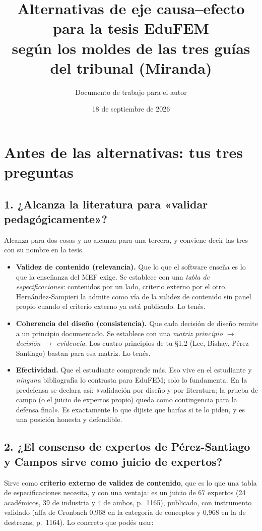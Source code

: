 \documentclass[11pt,a4paper]{article}
\title{Alternativas de eje causa--efecto para la tesis EduFEM\\
\large según los moldes de las tres guías del tribunal (Miranda)}
\author{Documento de trabajo para el autor}
\date{18 de septiembre de 2026}
\begin{document}
\maketitle

\section*{Antes de las alternativas: tus tres preguntas}

\subsection*{1. ¿Alcanza la literatura para «validar pedagógicamente»?}

Alcanza para dos cosas y no alcanza para una tercera, y conviene decir las tres con su nombre en la tesis.

\begin{itemize}
\item \textbf{Validez de contenido (relevancia).} Que lo que el software enseña es lo que la enseñanza del MEF exige. Se establece con una \emph{tabla de especificaciones}: contenidos por un lado, criterio externo por el otro. Hernández-Sampieri la admite como vía de la validez de contenido sin panel propio cuando el criterio externo ya está publicado. Lo tenés.
\item \textbf{Coherencia del diseño (consistencia).} Que cada decisión de diseño remite a un principio documentado. Se establece con una \emph{matriz principio $\to$ decisión $\to$ evidencia}. Los cuatro principios de tu §1.2 (Lee, Bishay, Pérez-Santiago) bastan para esa matriz. Lo tenés.
\item \textbf{Efectividad.} Que el estudiante comprende más. Eso vive en el estudiante y \emph{ninguna} bibliografía lo contrasta para EduFEM; solo lo fundamenta. En la predefensa se declara así: «validación por diseño y por literatura; la prueba de campo (o el juicio de expertos propio) queda como contingencia para la defensa final». Es exactamente lo que dijiste que harías si te lo piden, y es una posición honesta y defendible.
\end{itemize}

\subsection*{2. ¿El consenso de expertos de Pérez-Santiago y Campos sirve como juicio de expertos?}

Sirve como \textbf{criterio externo de validez de contenido}, que es lo que una tabla de especificaciones necesita, y con una ventaja: es un juicio de 67 expertos (24 académicos, 39 de industria y 4 de ambos, p.~1165), publicado, con instrumento validado (alfa de Cronbach 0,968 en la categoría de conceptos y 0,968 en la de destrezas, p.~1164). Lo concreto que podés usar:
\end{document}
